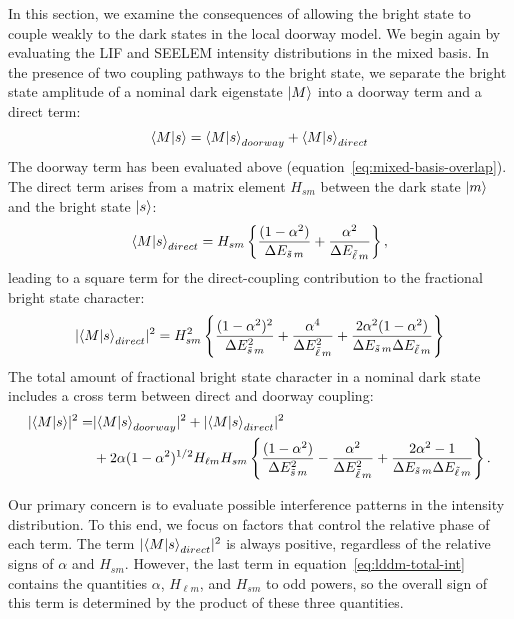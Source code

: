\documentclass[12pt]{mitthesis}
\newcommand{\ts}{\tilde{s}\,}
\newcommand{\tl}{\tilde{\ell}\,}
\begin{document}
In this section, we examine the consequences of allowing the bright
state to couple weakly to the dark states in the local doorway model.
We begin again by evaluating the LIF and SEELEM intensity distributions
in the mixed basis. In the presence of two coupling pathways to the
bright state, we separate the bright state amplitude of a nominal dark
eigenstate $\mathinner{|{M}\rangle}$ into a doorway term and a direct term:
\begin{equation}
\mathinner{\langle{M|s}\rangle} = \mathinner{\langle{M|s}\rangle}_{doorway} + \mathinner{\langle{M|s}\rangle}_{direct}
\end{equation}
The doorway term has been evaluated above
(equation~\ref{eq:mixed-basis-overlap}).  The direct term arises from
a matrix element $H_{sm}$ between the dark state $\mathinner{|{m}\rangle}$ and the
bright state $\mathinner{|{s}\rangle}$:
\begin{equation}
\braket{M|s}_{direct} = H_{sm} 
\left \lbrace 
  \frac{(1 - \alpha^2)}{\Delta E_{\ts m}} + 
  \frac{\alpha^2}{\Delta E_{\tl m}}
\right \rbrace,
\end{equation}
leading to a square term for the direct-coupling contribution to the
fractional bright state character:
\begin{equation}
  \label{eq:lddm-direct-int}
  \lvert \braket{M|s}_{direct} \rvert^2 = H_{sm}^2
  \left \lbrace
    \frac{(1 - \alpha^2)^2}{\Delta E_{\ts m}^2} +
    \frac{\alpha^4}{\Delta E_{\tl m}^2} +
    \frac{2 \alpha^2 (1 - \alpha^2)}
         {\Delta E_{\ts m} \Delta E_{\tl m}}
  \right \rbrace
\end{equation}
The total amount of fractional bright state character in a nominal
dark state includes a cross term between direct and doorway coupling:
\begin{equation}
  \label{eq:lddm-total-int}
  \begin{split}
    \lvert \braket{M|s} \rvert^2 =&
    \lvert \braket{M|s}_{doorway} \rvert^2 + 
    \lvert \braket{M|s}_{direct} \rvert^2 \\
    & + 2 \alpha (1-\alpha^2)^{1/2} H_{\ell m} H_{s m}
    \left \lbrace
      \frac{(1-\alpha^2)}{\Delta E_{\ts m}^2}
      - \frac{\alpha^2}{\Delta E_{\tl m}^2}
      + \frac{2\alpha^2 -1}{\Delta E_{\ts m} \Delta E_{\tl m}}
    \right \rbrace.\\
  \end{split}
\end{equation}

Our primary concern is to evaluate possible interference patterns in
the intensity distribution.  To this end, we focus on factors that control
the relative phase of each term.  The term $\lvert
\mathinner{\langle{M|s}\rangle}_{direct} \rvert^2$ is always positive, regardless of the
relative signs of $\alpha$ and $H_{sm}$.  However, the last term in
equation~\ref{eq:lddm-total-int} contains the quantities $\alpha$,
$H_{\ell m}$, and $H_{sm}$ to odd powers, so the overall sign of this
term is determined by the product of these three quantities.
\end{document}
